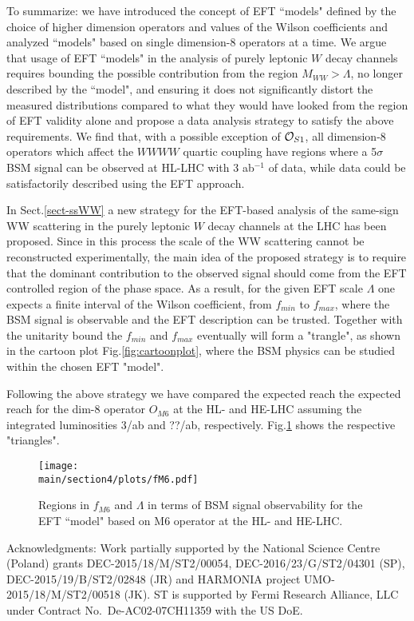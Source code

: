 To summarize:  we  have introduced the concept of EFT ``models" defined by the choice of higher dimension operators and values of the Wilson coefficients and analyzed ``models" based on single dimension-8 operators at a time.  
We argue that usage of EFT ``models" in the analysis of purely
leptonic $W$ decay channels requires bounding the possible contribution from
the region $M_{WW} > \Lambda$, no longer described by the ``model",
and ensuring it does not significantly distort the measured distributions 
compared to what they would have looked from the region of EFT validity alone and 
propose a data analysis strategy to satisfy the above requirements.  We find that, with a possible exception of ${\cal O}_{S1}$, all dimension-8 operators which affect the
$WWWW$ quartic coupling have regions where
a 5$\sigma$ BSM signal can be observed at HL-LHC with 3 ab$^{-1}$ of data, while data
could be satisfactorily described using the EFT approach. 


In Sect.\ref{sect-ssWW} a new strategy for the EFT-based analysis of the same-sign WW scattering  in the purely leptonic $W$ decay channels at the LHC has been proposed. Since in this process the scale of the WW scattering cannot be reconstructed experimentally, the main idea of the proposed strategy is to require that the dominant contribution to the observed signal should come from the EFT controlled region of the phase space. As a result, for the given EFT scale $\Lambda$ one expects a finite  interval of the Wilson coefficient,  from $f_{min}$ to $f_{max}$, where the BSM signal is observable and the EFT description can be trusted. Together with the unitarity bound  the $f_{min}$ and $f_{max}$ eventually will form a "trangle", as shown in the cartoon plot Fig.\ref{fig:cartoonplot}, where the BSM physics can be studied within the chosen EFT "model". 

Following the above strategy  we have compared the expected reach the expected reach for the dim-8 operator $O_{M6}$ at the HL- and HE-LHC  assuming the integrated luminosities 3/ab and ??/ab, respectively.  Fig.\ref{fig:fM6} shows the respective "triangles". 
\begin{figure}
\centering
\texttt{[image: \\main/section4/plots/fM6.pdf]}
\caption{
Regions in $f_{M6}$ and $\Lambda$ in terms of BSM signal observability
for the EFT ``model"  based on M6 operator at the HL- and HE-LHC.}
\label{fig:fM6}
\end{figure}




%
Acknowledgments: 
Work partially supported by the National Science Centre (Poland) grants
DEC-2015/18/M/ST2/00054,  DEC-2016/23/G/ST2/04301 (SP), DEC-2015/19/B/ST2/02848 (JR) and 
HARMONIA project 
UMO-2015/18/M/ST2/00518  (JK). 
ST is supported by Fermi Research Alliance, LLC under Contract No.~De-AC02-07CH11359 with the US DoE.

